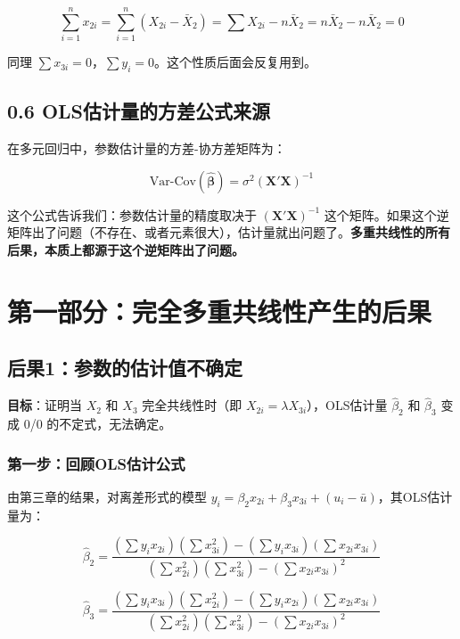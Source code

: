 \documentclass[12pt,a4paper]{ctexart}
\begin{document}
\begin{equation}
\sum_{i=1}^{n} x_{2i} = \sum_{i=1}^{n} (X_{2i} - \bar{X}_2) = \sum X_{2i} - n\bar{X}_2 = n\bar{X}_2 - n\bar{X}_2 = 0
\end{equation}

同理 $\sum x_{3i} = 0$，$\sum y_i = 0$。这个性质后面会反复用到。

\subsection{0.6 OLS估计量的方差公式来源}

在多元回归中，参数估计量的方差-协方差矩阵为：

\begin{equation}
\text{Var-Cov}(\hat{\boldsymbol{\beta}}) = \sigma^2 (\mathbf{X}'\mathbf{X})^{-1}
\end{equation}

这个公式告诉我们：参数估计量的精度取决于 $(\mathbf{X}'\mathbf{X})^{-1}$ 这个矩阵。如果这个逆矩阵出了问题（不存在、或者元素很大），估计量就出问题了。\textbf{多重共线性的所有后果，本质上都源于这个逆矩阵出了问题。}

\section{第一部分：完全多重共线性产生的后果}

\subsection{后果1：参数的估计值不确定}

\textbf{目标}：证明当 $X_2$ 和 $X_3$ 完全共线性时（即 $X_{2i} = \lambda X_{3i}$），OLS估计量 $\hat{\beta}_2$ 和 $\hat{\beta}_3$ 变成 0/0 的不定式，无法确定。

\subsubsection{第一步：回顾OLS估计公式}

由第三章的结果，对离差形式的模型 $y_i = \beta_2 x_{2i} + \beta_3 x_{3i} + (u_i - \bar{u})$，其OLS估计量为：

\begin{equation}
\hat{\beta}_2 = \frac{(\sum y_i x_{2i})(\sum x_{3i}^2) - (\sum y_i x_{3i})(\sum x_{2i} x_{3i})}{(\sum x_{2i}^2)(\sum x_{3i}^2) - (\sum x_{2i} x_{3i})^2} \tag{4.5}
\end{equation}

\begin{equation}
\hat{\beta}_3 = \frac{(\sum y_i x_{3i})(\sum x_{2i}^2) - (\sum y_i x_{2i})(\sum x_{2i} x_{3i})}{(\sum x_{2i}^2)(\sum x_{3i}^2) - (\sum x_{2i} x_{3i})^2} \tag{4.6}
\end{equation}
\end{document}
